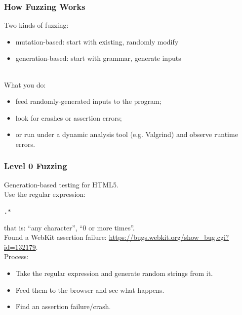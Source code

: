 \documentclass{beamer}
\newenvironment{changemargin}[1]{%
  \begin{list}{}{%
    \setlength{\topsep}{0pt}%
    \setlength{\leftmargin}{#1}%
    \setlength{\rightmargin}{1em}
    \setlength{\listparindent}{\parindent}%
    \setlength{\itemindent}{\parindent}%
    \setlength{\parsep}{\parskip}%
  }%
  \item[]}{\end{list}}
\begin{document}
\usebackgroundtemplate{}

\begin{frame}
  \frametitle{How Fuzzing Works}
  \begin{changemargin}{2em}
    Two kinds of fuzzing:
    \begin{itemize}
    \item \alert{mutation-based}: start with existing, randomly modify
    \item \alert{generation-based}: start with grammar, generate inputs
    \end{itemize}

    ~\\
    What you do:
    \begin{itemize}
    \item feed randomly-generated inputs to the program;
    \item look for crashes or assertion errors;
    \item or run under a dynamic analysis tool (e.g. Valgrind) and observe runtime errors.
    \end{itemize}
  \end{changemargin}
\end{frame}


\begin{frame}
  \frametitle{Level 0 Fuzzing}
  \begin{changemargin}{2em}
    Generation-based testing for HTML5.\\[1em]

    Use the regular expression:\\
    \begin{center}
      {\tt .*}
    \end{center}
    that is: ``any character'', ``0 or more times''.\\[1em]
    
Found a WebKit assertion failure:
\url{https://bugs.webkit.org/show_bug.cgi?id=132179}.\\

Process:
\begin{itemize}
\item Take the regular expression and generate random strings from it.
  \item Feed them to the browser and see
    what happens.
  \item Find an assertion failure/crash.
\end{itemize}
  \end{changemargin}
\end{frame}
\end{document}
